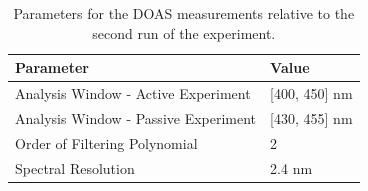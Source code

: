 \begin{table}[htpb]
    \centering
    \caption{Parameters for the DOAS measurements relative to the second
    run of the experiment.}
    \label{tab:doas_parameters}
    \begin{tabular}{@{}ll@{}}
        \toprule
        \textbf{Parameter}                   & \textbf{Value}    \\
        \midrule
        Analysis Window - Active Experiment  & {[}400, 450{]} nm \\
        \midrule
        Analysis Window - Passive Experiment & {[}430, 455{]} nm \\
        \midrule
        Order of Filtering Polynomial        & 2                 \\
        \midrule
        Spectral Resolution                  & 2.4 nm           \\
        \bottomrule
    \end{tabular}
\end{table}

